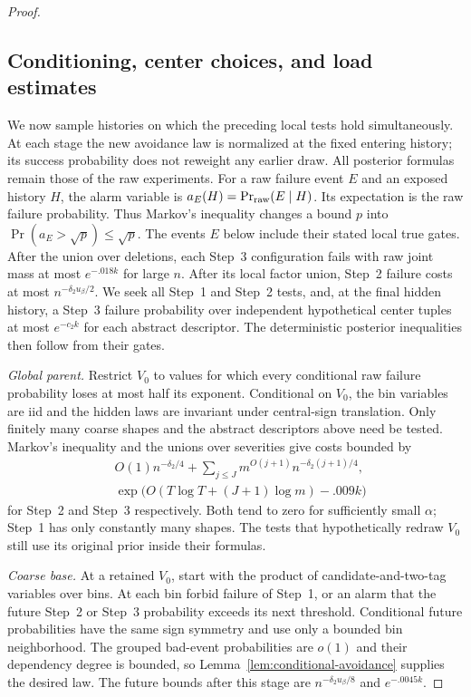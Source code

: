\begin{proof}
\subsection{Conditioning, center choices, and load estimates}
\label{sec:conditioning-center-choices-and-load-estimates}

We now sample histories on which the preceding local tests hold
simultaneously. At each stage the new avoidance law is normalized at the
fixed entering history; its success probability does not reweight any
earlier draw. All posterior formulas remain those of the raw experiments.
For a raw failure event \(E\) and an exposed history \(H\), the alarm
variable is \(a_E(H)=\Pr_{\rm raw}(E\mid H)\). Its expectation is the
raw failure probability. Thus Markov's inequality changes a bound \(p\)
into \(\Pr(a_E>\sqrt p)\le\sqrt p\). The events \(E\) below include
their stated local true gates.
After the union over deletions, each Step~3 configuration fails with raw
joint mass at most \(e^{-.018k}\) for large \(n\).
After its local factor union, Step~2 failure costs at most
\(n^{-\delta_2u_\beta/2}\).
We seek all Step~1 and Step~2 tests, and, at the final hidden history,
a Step~3 failure probability over independent hypothetical center tuples
at most \(e^{-c_2k}\) for each abstract descriptor.
The deterministic posterior inequalities then follow from their gates.

\emph{Global parent.} Restrict \(V_0\) to values for which every
conditional raw failure probability loses at most half its exponent.
Conditional on \(V_0\), the bin variables are iid and the hidden laws
are invariant under central-sign translation. Only finitely many coarse
shapes and the abstract descriptors above need be tested.
Markov's inequality and the unions over severities give costs bounded by
\[
 \begin{aligned}
 &O(1)n^{-\delta_2/4}
       +\sum_{j\le J}m^{O(j+1)}n^{-\delta_2(j+1)/4},\\
 &\exp\bigl(O(T\log T+(J+1)\log m)-.009k\bigr)
 \end{aligned}
\]
for Step~2 and Step~3 respectively. Both tend to zero for sufficiently
small \(\alpha\); Step~1 has only constantly many shapes.
The tests that hypothetically redraw \(V_0\) still use its original
prior inside their formulas.

\emph{Coarse base.} At a retained \(V_0\), start with the product of
candidate-and-two-tag variables over bins. At each bin forbid failure of
Step~1, or an alarm that the future Step~2 or Step~3 probability exceeds
its next threshold. Conditional future probabilities have the same sign
symmetry and use only a bounded bin neighborhood. The grouped bad-event
probabilities are \(o(1)\) and their dependency degree is bounded, so
Lemma~\ref{lem:conditional-avoidance} supplies the desired law.
The future bounds after this stage are
\(n^{-\delta_2u_\beta/8}\) and \(e^{-.0045k}\).


\end{proof}
